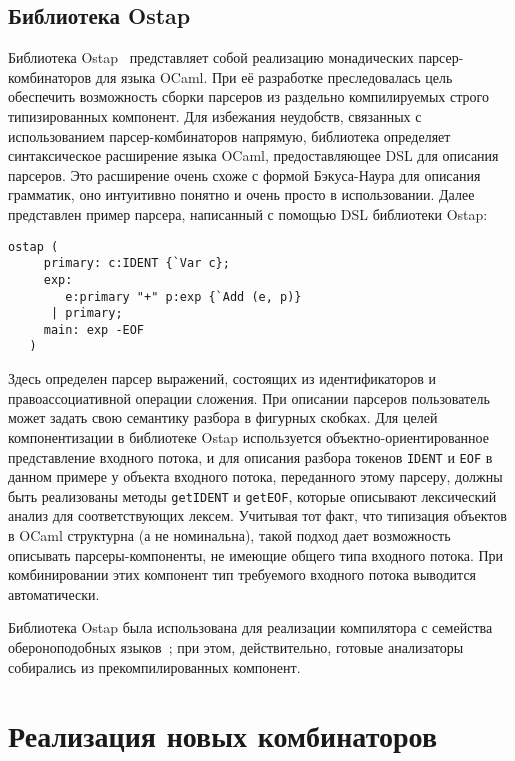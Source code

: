 \documentclass[conference]{IEEEtran}
\begin{document}
\subsection{Библиотека Ostap}

Библиотека Ostap~\cite{ostap} представляет собой реализацию монадических парсер-комбинаторов для языка OCaml. При её разработке преследовалась цель обеспечить возможность
сборки парсеров из раздельно компилируемых строго типизированных компонент. Для избежания неудобств, связанных с использованием парсер-комбинаторов напрямую, библиотека определяет
синтаксическое расширение языка OCaml, предоставляющее DSL для описания парсеров. Это расширение очень схоже с формой Бэкуса-Наура для описания грамматик, оно интуитивно понятно
и очень просто в использовании. Далее представлен пример парсера, написанный с помощью DSL библиотеки Ostap:

\begin{lstlisting}[basicstyle=\small]
   ostap (
     primary: c:IDENT {`Var c};
     exp:
        e:primary "+" p:exp {`Add (e, p)}
      | primary;
     main: exp -EOF
   )
\end{lstlisting}

Здесь определен парсер выражений, состоящих из идентификаторов и правоассоциативной операции сложения. При описании парсеров пользователь может задать свою семантику разбора в фигурных скобках.
Для целей компонентизации в библиотеке Ostap используется объектно-ориентированное представление входного потока, и для описания разбора токенов \lstinline|IDENT| и \lstinline|EOF| в данном
примере у объекта входного потока, переданного этому парсеру, должны быть реализованы методы \lstinline|getIDENT| и \lstinline|getEOF|, которые описывают лексический анализ для соответствующих
лексем. Учитывая тот факт, что типизация объектов в OCaml структурна (а не номинальна), такой подход дает возможность описывать парсеры-компоненты, не имеющие общего типа входного потока.
При комбинировании этих компонент тип требуемого входного потока выводится автоматически.

Библиотека Ostap была использована для реализации компилятора с семейства обероноподобных языков~\cite{boulytchev2015combinators}; при этом, действительно, готовые анализаторы собирались из
прекомпилированных компонент.

\section{Реализация новых комбинаторов}
\end{document}
